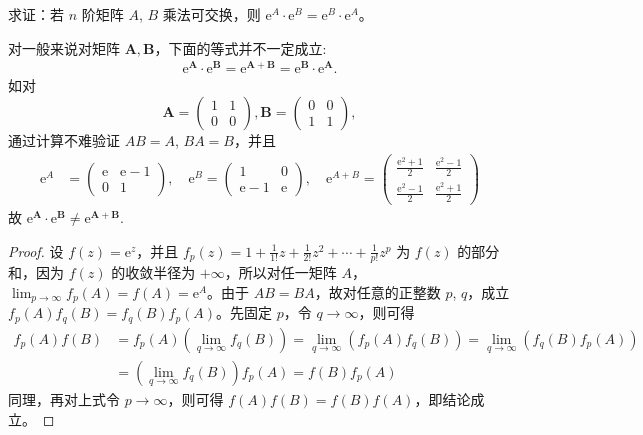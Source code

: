 \documentclass[../../main.tex]{subfiles}%
\begin{document}
\begin{proposition}\label{proposition:若A,B乘法可交换,则e^A,e^B也乘法可交换}
求证：若 $n$ 阶矩阵 $A$, $B$ 乘法可交换，则 $\mathrm{e}^A\cdot\mathrm{e}^B = \mathrm{e}^B\cdot\mathrm{e}^A$。
\end{proposition}
\begin{remark}
对一般来说对矩阵 $\boldsymbol{A},\boldsymbol{B}$，下面的等式并不一定成立:
\begin{align*}
\mathrm{e}^{\boldsymbol{A}}\cdot\mathrm{e}^{\boldsymbol{B}}=\mathrm{e}^{\boldsymbol{A}+\boldsymbol{B}}=\mathrm{e}^{\boldsymbol{B}}\cdot\mathrm{e}^{\boldsymbol{A}}.
\end{align*}
如对
\[
\boldsymbol{A}=\begin{pmatrix}
1 & 1 \\
0 & 0
\end{pmatrix}, \boldsymbol{B}=\begin{pmatrix}
0 & 0 \\
1 & 1
\end{pmatrix},
\]
通过计算不难验证 $AB = A$, $BA = B$，并且
\begin{align*}
\mathrm{e}^A &= 
\begin{pmatrix}
\mathrm{e} & \mathrm{e} - 1 \\
0 & 1
\end{pmatrix}, \quad
\mathrm{e}^B = 
\begin{pmatrix}
1 & 0 \\
\mathrm{e} - 1 & \mathrm{e}
\end{pmatrix}, \quad
\mathrm{e}^{A + B} = 
\begin{pmatrix}
\frac{\mathrm{e}^2 + 1}{2} & \frac{\mathrm{e}^2 - 1}{2} \\
\frac{\mathrm{e}^2 - 1}{2} & \frac{\mathrm{e}^2 + 1}{2}
\end{pmatrix}
\end{align*} 
故
$\mathrm{e}^{\boldsymbol{A}}\cdot\mathrm{e}^{\boldsymbol{B}}\neq\mathrm{e}^{\boldsymbol{A}+\boldsymbol{B}}$. 
\end{remark}
\begin{proof}
设 $f(z)=\mathrm{e}^z$，并且 $f_p(z)=1+\frac{1}{1!}z+\frac{1}{2!}z^2+\cdots+\frac{1}{p!}z^p$ 为 $f(z)$ 的部分和，因为 $f(z)$ 的收敛半径为 $+\infty$，所以对任一矩阵 $A$，$\lim_{p\to\infty}f_p(A)=f(A)=\mathrm{e}^A$。由于 $AB = BA$，故对任意的正整数 $p$, $q$，成立 $f_p(A)f_q(B)=f_q(B)f_p(A)$。先固定 $p$，令 $q\to\infty$，则可得
\begin{align*}
f_p(A)f(B) &= f_p(A)\left(\lim_{q\to\infty}f_q(B)\right)=\lim_{q\to\infty}\left(f_p(A)f_q(B)\right)=\lim_{q\to\infty}\left(f_q(B)f_p(A)\right)\\
&=\left(\lim_{q\to\infty}f_q(B)\right)f_p(A)=f(B)f_p(A)
\end{align*}
同理，再对上式令 $p\to\infty$，则可得 $f(A)f(B)=f(B)f(A)$，即结论成立。 
\end{proof}
\end{document}
